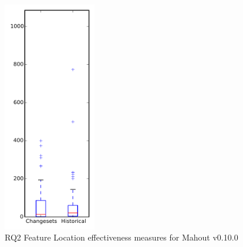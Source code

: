 
\begin{figure}[t]
\centering
\includegraphics[width=0.36\textwidth]{figures/flt/rq2_mahout}
\caption{RQ2 Feature Location effectiveness measures for Mahout v0.10.0}
\label{fig:flt:rq2:mahout}
\end{figure}

